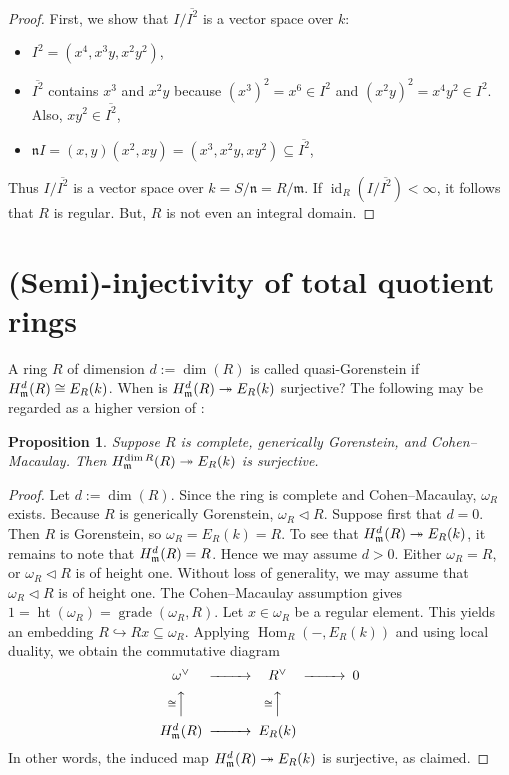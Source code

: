 \documentclass[10. pt,a4paper]{amsart}
\newtheorem{proposition}[theorem]{Proposition}
\theoremstyle{definition}
\theoremstyle{remark}
\newcommand{\id}{\operatorname{id}}
\newcommand{\Hom}{\operatorname{Hom}}
\newcommand{\fm}{\frak{m}}
\begin{document}
\begin{proof}First, we show that
	$I / \overline{I^2}$ is a vector space over $k$:
\begin{itemize}
	\item $I^2 = (x^4, x^3y, x^2y^2)$,
	\item $\overline{I^2}$ contains $x^3$ and $x^2y$ because $(x^3)^2 = x^6 \in I^2$ and $(x^2y)^2 = x^4y^2 \in I^2$. Also, $xy^2\in\overline{I^2}$,
	\item $\mathfrak{n} I = (x,y)(x^2, xy) = (x^3, x^2y, xy^2) \subseteq \overline{I^2}$,
\end{itemize}

Thus $I / \overline{I^2}$ is a vector space over $k = S/\mathfrak{n}=R/\mathfrak{m}$. If $\id_R(I/\overline{I^{2}}) <\infty$, it follows that $R$ is regular. But, $R$ is not even an integral domain.
\end{proof}
\medskip
\section{(Semi)-injectivity of total quotient rings}

A ring $R$ of dimension $d := \dim(R)$ is called quasi-Gorenstein if $H^d_{\fm}(R) \cong E_R(k)$. When is $H^d_{\fm}(R) \twoheadrightarrow E_R(k)$ surjective? The following may be regarded as a higher version of \cite[15.17]{E}:

\begin{proposition}
	Suppose $R$ is complete, generically Gorenstein, and Cohen--Macaulay. Then $H^{\dim R}_{\fm}(R) \twoheadrightarrow E_R(k)$ is surjective.
\end{proposition}

\begin{proof}
	Let $d := \dim(R)$. Since the ring is complete and Cohen--Macaulay, $\omega_R$ exists. Because $R$ is generically Gorenstein, $\omega_R \lhd R$. Suppose first that $d = 0$. Then $R$ is Gorenstein, so $\omega_R = E_R(k) = R$. To see that $H^d_{\fm}(R) \twoheadrightarrow E_R(k)$, it remains to note that $H^d_{\fm}(R) = R$. Hence we may assume $d > 0$. Either $\omega_R = R$, or $\omega_R \lhd R$ is of height one. Without loss of generality, we may assume that $\omega_R \lhd R$ is of height one. The Cohen--Macaulay assumption gives $1 = \operatorname{ht}(\omega_R) = \operatorname{grade}(\omega_R, R)$. Let $x \in \omega_R$ be a regular element. This yields an embedding $R \hookrightarrow Rx \subseteq \omega_R$. Applying $\Hom_R(-, E_R(k))$ and using local duality, we obtain the commutative diagram
	\[
	\begin{CD}
	\omega^{\vee} @>>> R^{\vee} @>>> 0 \\
	@A{\cong}AA @A{\cong}AA \\
	H^d_{\fm}(R) @>>> E_R(k)
	\end{CD}
	\]
	In other words, the induced map $H^d_{\fm}(R) \twoheadrightarrow E_R(k)$ is surjective, as claimed.
\end{proof}
\end{document}
